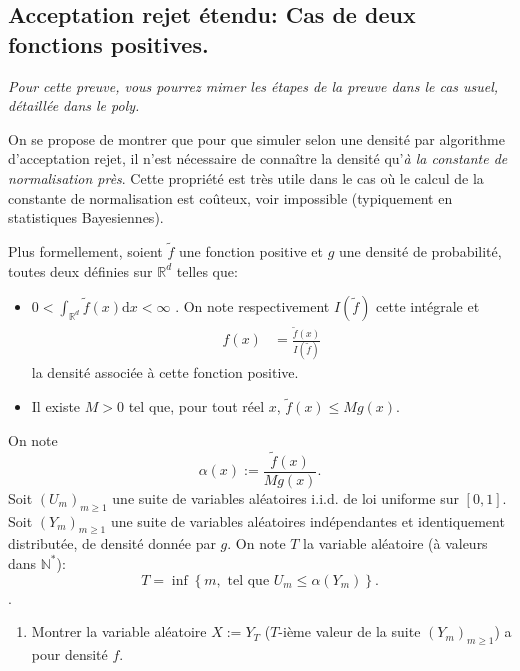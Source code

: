 \documentclass[]{article}
\providecommand{\tightlist}{%
  \setlength{\itemsep}{0pt}\setlength{\parskip}{0pt}}
\begin{document}
\hypertarget{acceptation-rejet-uxe9tendu-cas-de-deux-fonctions-positives.}{%
\subsection{Acceptation rejet étendu: Cas de deux fonctions
positives.}\label{acceptation-rejet-uxe9tendu-cas-de-deux-fonctions-positives.}}

\emph{Pour cette preuve, vous pourrez mimer les étapes de la preuve dans
le cas usuel, détaillée dans le poly.}

On se propose de montrer que pour que simuler selon une densité par
algorithme d'acceptation rejet, il n'est nécessaire de connaître la
densité qu'\emph{à la constante de normalisation près}. Cette propriété
est très utile dans le cas où le calcul de la constante de normalisation
est coûteux, voir impossible (typiquement en statistiques Bayesiennes).

Plus formellement, soient \(\tilde{f}\) une fonction positive et \(g\)
une densité de probabilité, toutes deux définies sur \(\mathbb{R}^d\)
telles que:

\begin{itemize}
\tightlist
\item
  \(0 < \int_{\mathbb{R}^d}\tilde{f}(x)\text{d}x < \infty\) . On note
  respectivement \(I(\tilde{f})\) cette intégrale et \begin{align*}
  f(x) &= \frac{\tilde{f}(x)}{I(\tilde{f})}
  \end{align*} la densité associée à cette fonction positive.
\item
  Il existe \(M>0\) tel que, pour tout réel \(x\),
  \(\tilde{f}(x) \leq M g(x)\).
\end{itemize}

On note \[\alpha(x) := \frac{\tilde{f}(x)}{Mg(x)}.\] Soit
\((U_m)_{m\geq 1}\) une suite de variables aléatoires i.i.d. de loi
uniforme sur \([0, 1]\). Soit \((Y_m)_{m\geq 1}\) une suite de variables
aléatoires indépendantes et identiquement distributée, de densité donnée
par \(g\). On note \(T\) la variable aléatoire (à valeurs dans
\(\mathbb{N}^*\)):
\[T = \inf\left\lbrace m, \text{ tel que } U_m \leq \alpha(Y_m)\right\rbrace.\].

\begin{enumerate}
\def\labelenumi{\arabic{enumi}.}
\tightlist
\item
  Montrer la variable aléatoire \(X := Y_T\) (\(T\)-ième valeur de la
  suite \((Y_m)_{m\geq 1}\)) a pour densité \(f\).
\end{enumerate}
\end{document}
